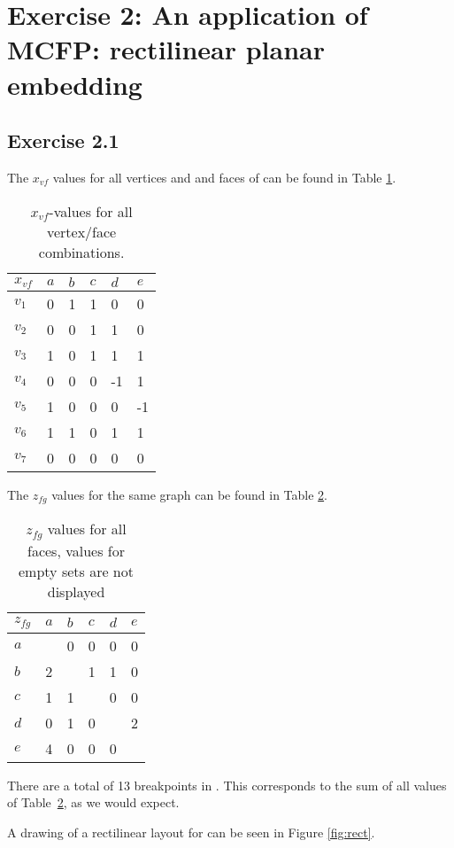 \section{Exercise 2: An application of MCFP: rectilinear planar embedding}
\subsection{Exercise 2.1}
The $x_{vf}$ values for all vertices and and faces of \cite[Figure
3]{assignment1} can be found in Table \ref{table:xvf}.
\begin{table}[h]
\centering
\begin{tabular}{l|lllll}
$x_{vf}$ & $a$ & $b$ & $c$ & $d$ & $e$ \\ \hline
$v_1$   & 0   & 1   & 1   & 0   & 0   \\
$v_2$   & 0   & 0   & 1   & 1   & 0   \\
$v_3$   & 1   & 0   & 1   & 1   & 1   \\
$v_4$   & 0   & 0   & 0   & -1  & 1   \\
$v_5$   & 1   & 0   & 0   & 0   & -1  \\
$v_6$   & 1   & 1   & 0   & 1   & 1   \\
$v_7$   & 0   & 0   & 0   & 0   & 0
\end{tabular}
\caption{$x_{vf}$-values for all vertex/face combinations.}
\label{table:xvf}
\end{table}
The $z_{fg}$ values for the same graph can be found in Table \ref{table:zfg}.
\begin{table}[h]
\centering
\begin{tabular}{l|lllll}
$z_{fg}$ & $a$ & $b$ & $c$ & $d$ & $e$ \\ \hline
$a$     &     & 0   & 0   &  0  & 0   \\
$b$     & 2   &     & 1   & 1   & 0   \\
$c$     & 1   & 1   &     & 0   & 0   \\
$d$     & 0   & 1   & 0   &     & 2   \\
$e$     & 4   & 0   & 0   & 0   &
\end{tabular}
\caption{$z_{fg}$ values for all faces, values for empty sets are not displayed}
\label{table:zfg}
\end{table}
There are a total of 13 breakpoints in \cite[Figure 3]{assignment1}. This corresponds
to the sum of all values of Table~\ref{table:zfg}, as we would expect.

A drawing of a rectilinear layout for \cite[Figure 2]{assignment1} can be seen
in Figure \ref{fig:rect}.
%
%

